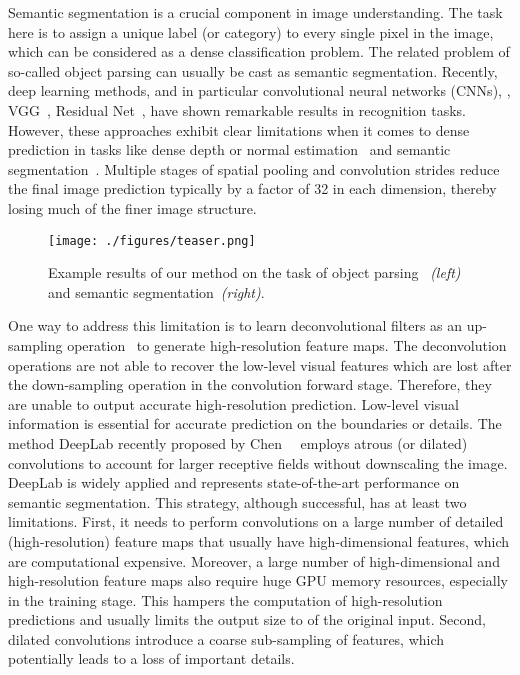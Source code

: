 \documentclass[10pt,twocolumn,letterpaper]{article}
\newcommand{\ep}[1]{\emph{(#1)}}
\begin{document}
Semantic segmentation is a crucial component in image understanding. The task here is to assign a unique label (or category) to every single pixel in the image, which can be considered as a dense classification problem. The related problem of so-called object parsing can usually be cast as semantic segmentation.
Recently, deep learning methods, and in particular convolutional neural networks (CNNs), \eg, VGG~\cite{simonyan2014very}, Residual Net~\cite{He:2016:ResNet}, have shown remarkable results in recognition tasks. 
However, these approaches exhibit clear limitations when it comes to dense prediction in tasks like dense depth or normal estimation~\cite{eigen2015predicting,liu2014deep,liu2015learning} and semantic segmentation~\cite{LongSD14,ChenPKMY14}. Multiple stages of spatial pooling and convolution strides reduce the final image prediction typically by a factor of 32 in each dimension, thereby losing much of the finer image structure.

\begin{figure}[t]
	\centering	
	\texttt{[image: ./figures/teaser.png]}	
\caption{Example results of our method on the task of object parsing~ \ep{left} and semantic segmentation~\ep{right}.}
\label{fig:teaser}
\end{figure}



One way to address this limitation is to learn deconvolutional filters as an up-sampling operation~\cite{noh2015learning,LongSD14} to generate high-resolution feature maps. 
The deconvolution operations are not able to recover the low-level visual features which are lost after the down-sampling operation in the convolution forward stage. Therefore,
they are unable to output accurate high-resolution prediction. Low-level visual information is essential for accurate prediction on the boundaries or details.
The method DeepLab recently proposed by Chen~\etal~\cite{ChenPK0Y16} employs atrous (or dilated) convolutions to account for larger receptive fields without downscaling the image. 
DeepLab is widely applied and represents state-of-the-art performance on semantic segmentation.
This strategy, although successful, has at least two limitations. 
First, it needs to perform convolutions on a large number of detailed (high-resolution) feature maps that usually have high-dimensional features, which are computational expensive.
Moreover, a large number of high-dimensional and high-resolution feature maps also require huge GPU memory resources, especially in the training stage.
This hampers the computation of high-resolution predictions and usually limits the output size to  of the original input.
Second, dilated convolutions introduce a coarse sub-sampling of features, which potentially leads to a loss of important details. 
\end{document}
